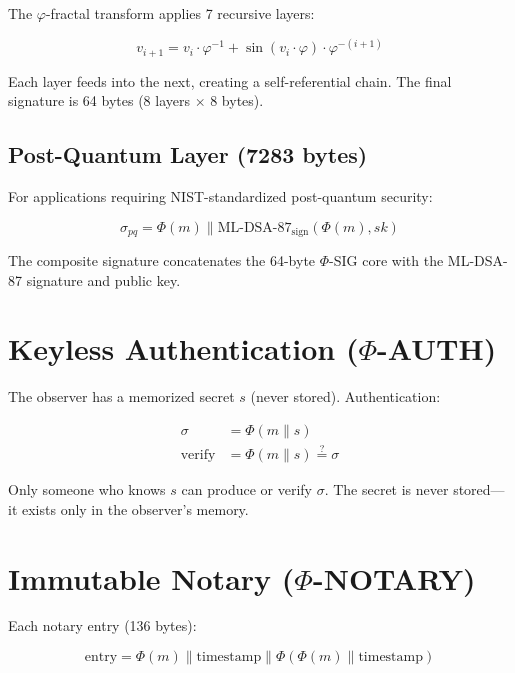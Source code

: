 \documentclass{article}
\begin{document}
The $\varphi$-fractal transform applies 7 recursive layers:

\begin{equation}
v_{i+1} = v_i \cdot \varphi^{-1} + \sin(v_i \cdot \varphi) \cdot \varphi^{-(i+1)}
\end{equation}

Each layer feeds into the next, creating a self-referential chain. The final signature is 64 bytes (8 layers $\times$ 8 bytes).

\subsection{Post-Quantum Layer (7283 bytes)}

For applications requiring NIST-standardized post-quantum security:

\begin{equation}
\sigma_{pq} = \Phi(m) \parallel \text{ML-DSA-87}_{\text{sign}}(\Phi(m), sk)
\end{equation}

The composite signature concatenates the 64-byte $\Phi$-SIG core with the ML-DSA-87 signature and public key.

\section{Keyless Authentication ($\Phi$-AUTH)}

The observer has a memorized secret $s$ (never stored). Authentication:

\begin{align}
\sigma &= \Phi(m \parallel s) \\
\text{verify} &= \Phi(m \parallel s) \stackrel{?}{=} \sigma
\end{align}

Only someone who knows $s$ can produce or verify $\sigma$. The secret is never stored—it exists only in the observer's memory.

\section{Immutable Notary ($\Phi$-NOTARY)}

Each notary entry (136 bytes):

\begin{equation}
\text{entry} = \Phi(m) \parallel \text{timestamp} \parallel \Phi(\Phi(m) \parallel \text{timestamp})
\end{equation}
\end{document}

